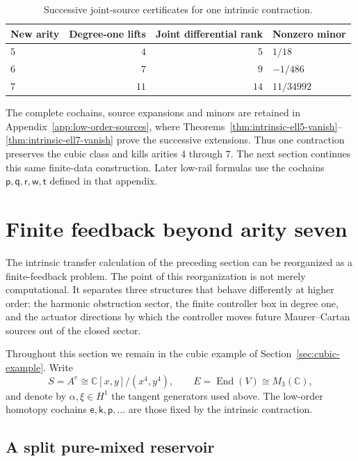 \documentclass[11pt]{amsart}
\newcommand{\End}{\operatorname{End}}
\newcommand{\C}{\mathbb C}
\begin{document}
\begin{table}[ht]
\centering
\caption{Successive joint-source certificates for one intrinsic contraction.}
\label{tab:joint-low-order}
\begin{tabular}{@{}lrrl@{}}
\toprule
New arity & Degree-one lifts & Joint differential rank & Nonzero minor\\
\midrule
$5$ & $4$ & $5$ & $1/18$\\
$6$ & $7$ & $9$ & $-1/486$\\
$7$ & $11$ & $14$ & $11/34992$\\
\bottomrule
\end{tabular}
\end{table}

The complete cochains, source expansions and minors are retained in
Appendix~\ref{app:low-order-sources}, where
Theorems~\ref{thm:intrinsic-ell5-vanish}--\ref{thm:intrinsic-ell7-vanish}
prove the successive extensions. Thus one contraction preserves the cubic
class and kills arities $4$ through $7$. The next section continues this
same finite-data construction. Later low-rail formulas use the cochains
$\mathsf p,\mathsf q,\mathsf r,\mathsf w,\mathsf t$ defined in that appendix.


\section{Finite feedback beyond arity seven}\label{sec:finite-feedback}

The intrinsic transfer calculation of the preceding section can be reorganized as a finite-feedback problem.  The point of this reorganization is not merely computational.  It separates three structures that behave differently at higher order: the harmonic obstruction sector, the finite controller box in degree one, and the actuator directions by which the controller moves future Maurer--Cartan sources out of the closed sector.

Throughout this section we remain in the cubic example of Section~\ref{sec:cubic-example}.  Write
\[
S=A^e\cong \C[x,y]/(x^4,y^4),
\qquad
E=\End(V)\cong M_3(\C),
\]
and denote by $\alpha,\xi\in H^1$ the tangent generators used above.  The low-order homotopy cochains $\mathsf e,\mathsf k,\mathsf p,\ldots$ are those fixed by the intrinsic contraction.

\subsection{A split pure-mixed reservoir}
\end{document}
